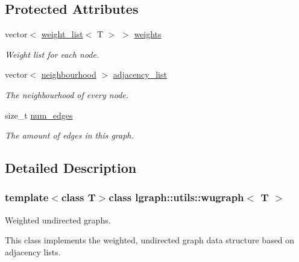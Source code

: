 \subsection*{Protected Attributes}
\begin{DoxyCompactItemize}
\item 
vector$<$ \hyperlink{namespacelgraph_1_1utils_a11e7963f3637ea13778b8d3e69d2c17f}{weight\-\_\-list}$<$ T $>$ $>$ \hyperlink{classlgraph_1_1utils_1_1wxgraph_a15569c8c0fccb641709dc81eb0e29c94}{weights}
\begin{DoxyCompactList}\small\item\em Weight list for each node. \end{DoxyCompactList}\item 
\hypertarget{classlgraph_1_1utils_1_1xxgraph_a1d5fda0d5aa89340f997428b982f966f}{vector$<$ \hyperlink{namespacelgraph_1_1utils_a0f2ef47028a466d26841709e705390ac}{neighbourhood} $>$ \hyperlink{classlgraph_1_1utils_1_1xxgraph_a1d5fda0d5aa89340f997428b982f966f}{adjacency\-\_\-list}}\label{classlgraph_1_1utils_1_1xxgraph_a1d5fda0d5aa89340f997428b982f966f}

\begin{DoxyCompactList}\small\item\em The neighbourhood of every node. \end{DoxyCompactList}\item 
\hypertarget{classlgraph_1_1utils_1_1xxgraph_a217ebb1cd8946fedfbf94a9b22f7da48}{size\-\_\-t \hyperlink{classlgraph_1_1utils_1_1xxgraph_a217ebb1cd8946fedfbf94a9b22f7da48}{num\-\_\-edges}}\label{classlgraph_1_1utils_1_1xxgraph_a217ebb1cd8946fedfbf94a9b22f7da48}

\begin{DoxyCompactList}\small\item\em The amount of edges in this graph. \end{DoxyCompactList}\end{DoxyCompactItemize}


\subsection{Detailed Description}
\subsubsection*{template$<$class T$>$class lgraph\-::utils\-::wugraph$<$ T $>$}

Weighted undirected graphs. 

This class implements the weighted, undirected graph data structure based on adjacency lists.



